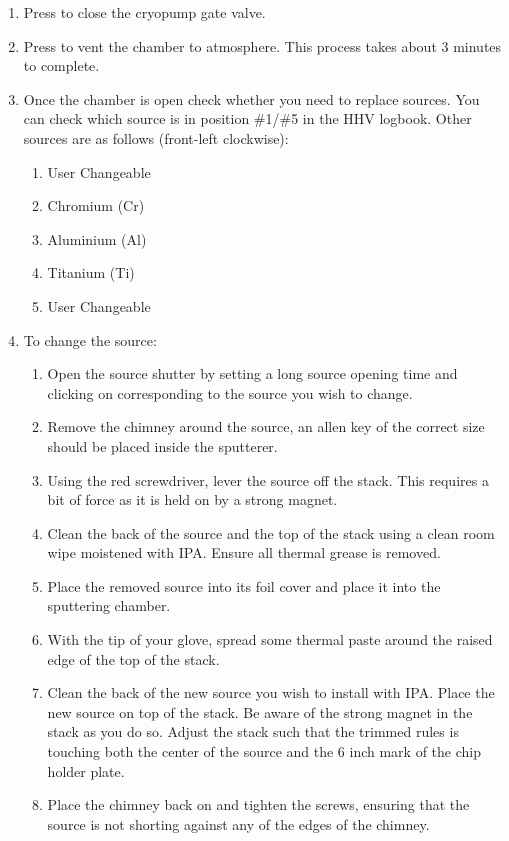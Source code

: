 \begin{enumerate}
\item Press  to close the cryopump gate valve.
\item Press  to vent the chamber to atmosphere. This process takes about 3 minutes to complete.
\item Once the chamber is open check whether you need to replace sources. You can check which source is in position \#1/\#5 in the HHV logbook. Other sources are as follows (front-left clockwise):
\begin{enumerate}[label=Source~\#\arabic*:,noitemsep,nolistsep]
  \item User Changeable
  \item Chromium (Cr)
  \item Aluminium (Al)
  \item Titanium (Ti)
  \item User Changeable
\end{enumerate}
\item To change the source:
\begin{enumerate} 
  \item Open the source shutter by setting a long source opening time and clicking on  corresponding to the source you wish to change.
  \item Remove the chimney around the source, an allen key of the correct size should be placed inside the sputterer.
  \item Using the red screwdriver, lever the source off the stack. This requires a bit of force as it is held on by a strong magnet.
  \item Clean the back of the source and the top of the stack using a clean room wipe moistened with IPA. Ensure all thermal grease is removed.
  \item Place the removed source into its foil cover and place it into the sputtering chamber.
  \item With the tip of your glove, spread some thermal paste around the raised edge of the top of the stack.
  \item Clean the back of the new source you wish to install with IPA. Place the new source on top of the stack. Be aware of the strong magnet in the stack as you do so.
  Adjust the stack such that the trimmed rules is touching both the center of the source and the 6 inch mark of the chip holder plate.
  \item Place the chimney back on and tighten the screws, ensuring that the source is not shorting against any of the edges of the chimney.

\end{enumerate}
\end{enumerate}
